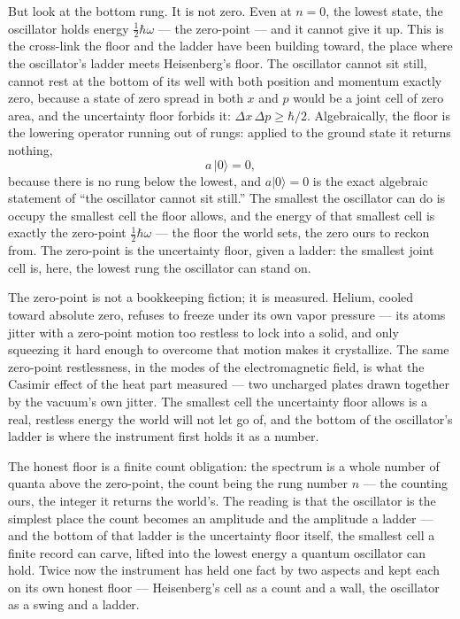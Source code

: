 But look at the bottom rung. It is not zero. Even at $n = 0$, the lowest state, the oscillator holds energy
$\tfrac12\hbar\omega$ --- the zero-point --- and it cannot give it up. This is the cross-link the floor and the ladder have
been building toward, the place where the oscillator's ladder meets Heisenberg's floor. The oscillator
cannot sit still, cannot rest at the bottom of its well with both position and momentum exactly zero, because
a state of zero spread in both $x$ and $p$ would be a joint cell of zero area, and the uncertainty floor
forbids it: $\Delta x\,\Delta p \ge \hbar/2$. Algebraically, the floor is the lowering operator running out of
rungs: applied to the ground state it returns nothing,
\begin{equation}
  a\,\lvert 0\rangle = 0,
\end{equation}
because there is no rung below the lowest, and $a\lvert 0\rangle = 0$ is the exact algebraic statement of ``the
oscillator cannot sit still.'' The smallest the oscillator can do is occupy the smallest cell the floor
allows, and the energy of that smallest cell is exactly the zero-point $\tfrac12\hbar\omega$ --- the floor
the world sets, the zero ours to reckon from. The zero-point is the uncertainty floor, given a ladder: the
smallest joint cell is, here, the lowest rung the oscillator can stand on.

The zero-point is not a bookkeeping fiction; it is measured. Helium, cooled toward absolute zero, refuses to
freeze under its own vapor pressure --- its atoms jitter with a zero-point motion too restless to lock into a
solid, and only squeezing it hard enough to overcome that motion makes it crystallize. The same zero-point
restlessness, in the modes of the electromagnetic field, is what the Casimir effect of the heat part measured
--- two uncharged plates drawn together by the vacuum's own jitter. The smallest cell the uncertainty floor
allows is a real, restless energy the world will not let go of, and the bottom of the oscillator's ladder is where the instrument first
holds it as a number.

The honest floor is a finite count obligation: the spectrum is a whole number of quanta above the zero-point,
the count being the rung number $n$ --- the counting ours, the integer it returns the world's. The reading is that the oscillator is the simplest place the count
becomes an amplitude and the amplitude a ladder --- and the bottom of that ladder is the uncertainty floor
itself, the smallest cell a finite record can carve, lifted into the lowest energy a quantum oscillator can
hold. Twice now the instrument has held one fact by two aspects and kept each on its own honest floor ---
Heisenberg's cell as a count and a wall, the oscillator as a swing and a ladder.

